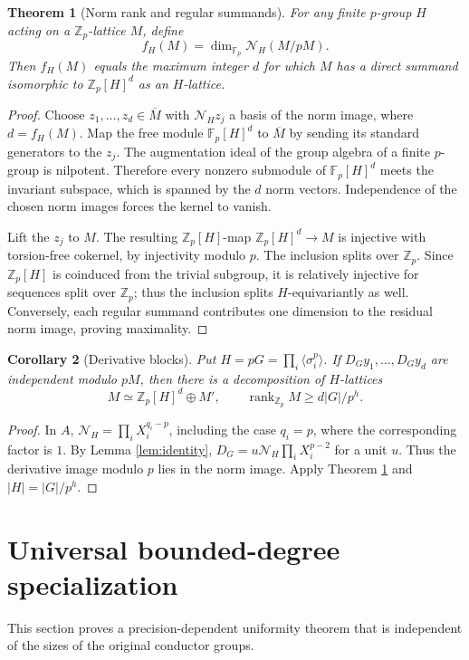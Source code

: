 \documentclass[11pt,a4paper]{article}
\newtheorem{theorem}{Theorem}[section]
\newtheorem{corollary}[theorem]{Corollary}
\theoremstyle{definition}
\theoremstyle{remark}
\newcommand{\Zp}{\mathbb Z_p}
\newcommand{\Fp}{\mathbb F_p}
\newcommand{\rk}{\operatorname{rank}}
\newcommand{\N}{\mathcal N}
\begin{document}
\begin{theorem}[Norm rank and regular summands]\label{thm:regular}
For any finite $p$-group $H$ acting on a $\Zp$-lattice $M$, define
\[
 f_H(M)=\dim_{\Fp}\N_H(M/pM).
\]
Then $f_H(M)$ equals the maximum integer $d$ for which $M$ has a direct summand isomorphic to $\Zp[H]^d$ as an $H$-lattice.
\end{theorem}
\begin{proof}
Choose $z_1,\ldots,z_d\in\overline M$ with $\N_Hz_j$ a basis of the norm image, where $d=f_H(M)$. Map the free module $\Fp[H]^d$ to $\overline M$ by sending its standard generators to the $z_j$. The augmentation ideal of the group algebra of a finite $p$-group is nilpotent. Therefore every nonzero submodule of $\Fp[H]^d$ meets the invariant subspace, which is spanned by the $d$ norm vectors. Independence of the chosen norm images forces the kernel to vanish.

Lift the $z_j$ to $M$. The resulting $\Zp[H]$-map $\Zp[H]^d\to M$ is injective with torsion-free cokernel, by injectivity modulo $p$. The inclusion splits over $\Zp$. Since $\Zp[H]$ is coinduced from the trivial subgroup, it is relatively injective for sequences split over $\Zp$; thus the inclusion splits $H$-equivariantly as well. Conversely, each regular summand contributes one dimension to the residual norm image, proving maximality.
\end{proof}

\begin{corollary}[Derivative blocks]\label{cor:blocks}
Put $H=pG=\prod_i\langle\sigma_i^p\rangle$. If $D_Gy_1,\ldots,D_Gy_d$ are independent modulo $pM$, then there is a decomposition of $H$-lattices
\begin{equation}\label{eq:blocks}
 M\simeq\Zp[H]^d\oplus M',\qquad
 \rk_{\Zp} M\ge d|G|/p^h.
\end{equation}
\end{corollary}
\begin{proof}
In $A$, $\N_H=\prod_iX_i^{q_i-p}$, including the case $q_i=p$, where the corresponding factor is $1$. By Lemma \ref{lem:identity}, $D_G=u\N_H\prod_iX_i^{p-2}$ for a unit $u$. Thus the derivative image modulo $p$ lies in the norm image. Apply Theorem \ref{thm:regular} and $|H|=|G|/p^h$.
\end{proof}

\section{Universal bounded-degree specialization}
This section proves a precision-dependent uniformity theorem that is independent of the sizes of the original conductor groups.
\end{document}
